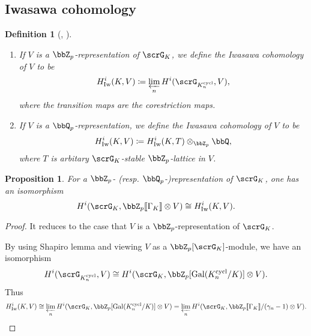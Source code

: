 \documentclass[a4paper,oneside]{amsart}
\newtheorem{proposition}[theorem]{Proposition}
\newtheorem{definition}[theorem]{Definition}
\numberwithin{equation}{section}
\numberwithin{figure}{section}
\begin{document}
\subsection{Iwasawa cohomology}
\begin{definition}[{\cite{perrin-riou_theorie_1994}, \cite[D\'efinition II.1.1]{cherbonnier_theorie_1999}}]\leavevmode
    \begin{enumerate}
        \item If $V$ is a $\bbZ_p$-representation of $\scrG_K$, we define the Iwasawa cohomology of $V$ to be
              $$H^i_{\opn{Iw}}(K,V)\coloneqq \varprojlim_n H^i(\scrG_{K_n^{\opn{cycl}}},V),$$
              where the transition maps are the corestriction maps.
        \item If $V$ is a $\bbQ_p$-representation, we define the Iwasawa cohomology of $V$ to be
              $$H^i_{\opn{Iw}}(K,V)\coloneqq H^i_{\opn{Iw}}(K,T)\otimes_{\bbZ_p} \bbQ,$$
              where $T$ is arbitary $\scrG_K$-stable $\bbZ_p$-lattice in $V$.
    \end{enumerate}
\end{definition}

\begin{proposition}
    For a $\bbZ_p$- (resp. $\bbQ_p$-)representation of $\scrG_K$, one has an isomorphism
    $$H^i(\scrG_K,\bbZ_p\llbracket \Gamma_K\rrbracket\otimes V)\cong H^i_{\opn{Iw}}(K,V).$$
\end{proposition}
\begin{proof}
    It reduces to the case that $V$ is a $\bbZ_p$-representation of $\scrG_K$.

    By using Shapiro lemma and viewing $V$ as a $\bbZ_p[\scrG_K]$-module, we have an isomorphism
    $$H^i(\scrG_{K_n^{\opn{cycl}}},V)\cong H^i(\scrG_K,\bbZ_p[\opn{Gal}(K_n^{\opn{cycl}}/K)]\otimes V).$$
    Thus
    $$H^i_{\opn{Iw}}(K,V)\cong\varprojlim_n H^i(\scrG_K,\bbZ_p[\opn{Gal}(K_n^{\opn{cycl}}/K)]\otimes V)=\varprojlim_n H^i(\scrG_K,\bbZ_p\llbracket\Gamma_K\rrbracket/(\gamma_n-1)\otimes V).$$
\end{proof}
\end{document}
